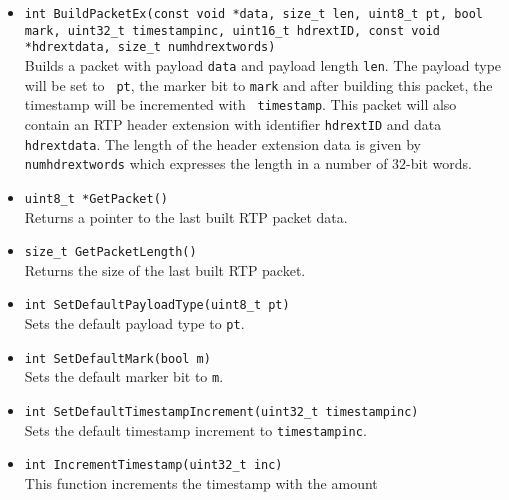 \documentclass[12pt,a4paper]{article}
\begin{document}
\begin{itemize}
{					                             uint16\_t hdrextID, const void *hdrextdata, size\_t numhdrextwords)}\\
						Builds a packet with payload {\tt data} and payload length
						{\tt len}. The payload type, marker and timestamp increment
						used will be those that have been set using the 
						{\tt SetDefault} functions below. This packet will also contain
						an RTP header extension with identifier {\tt hdrextID} and data
						{\tt hdrextdata}. The length of the header extension data
						is given by {\tt numhdrextwords} which expresses the length
						in a number of $32$-bit words.
					\item {\tt int BuildPacketEx(const void *data, size\_t len,
					                             uint8\_t pt, bool mark, uint32\_t timestampinc,
					                             uint16\_t hdrextID, const void *hdrextdata, size\_t numhdrextwords)}\\
						Builds a packet with payload {\tt data} and payload
						length {\tt len}. The payload type will be set to {\tt
						pt}, the marker bit to {\tt mark} and after building
						this packet, the timestamp will be incremented with {\tt
						timestamp}. This packet will also contain an RTP header
						extension with identifier {\tt hdrextID} and data {\tt
						hdrextdata}. The length of the header extension data is
						given by {\tt numhdrextwords} which expresses the length
						in a number of $32$-bit words.
					\item {\tt uint8\_t *GetPacket()}\\
						Returns a pointer to the last built RTP packet data.
					\item {\tt size\_t GetPacketLength()}\\
						Returns the size of the last built RTP packet.
					\item {\tt int SetDefaultPayloadType(uint8\_t pt)}\\
						Sets the default payload type to {\tt pt}.
					\item {\tt int SetDefaultMark(bool m)}\\
						Sets the default marker bit to {\tt m}.
					\item {\tt int SetDefaultTimestampIncrement(uint32\_t timestampinc)}\\
						Sets the default timestamp increment to {\tt timestampinc}.
					\item {\tt int IncrementTimestamp(uint32\_t inc)}\\
						This function increments the timestamp with the amount

\end{itemize}
\end{document}
